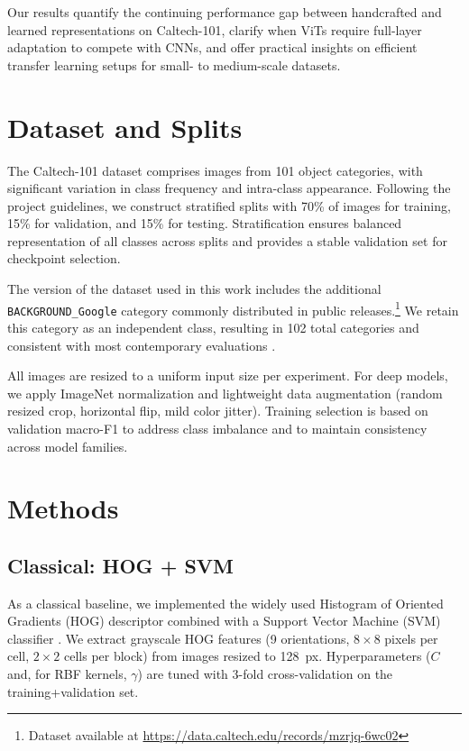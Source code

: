 \documentclass[11pt]{article}
\begin{document}
Our results quantify the continuing performance gap between handcrafted and learned representations on Caltech-101, clarify when ViTs require full-layer adaptation to compete with CNNs, and offer practical insights on efficient transfer learning setups for small- to medium-scale datasets.

\section{Dataset and Splits}
The Caltech-101 dataset \cite{FeiFei2004} comprises images from 101 object categories, with significant variation in class frequency and intra-class appearance. Following the project guidelines, we construct stratified splits with 70\% of images for training, 15\% for validation, and 15\% for testing. Stratification ensures balanced representation of all classes across splits and provides a stable validation set for checkpoint selection.

The version of the dataset used in this work includes the additional \texttt{BACKGROUND\_Google} category commonly distributed in public releases.\footnote{Dataset available at \url{https://data.caltech.edu/records/mzrjq-6wc02}} We retain this category as an independent class, resulting in 102 total categories and consistent with most contemporary evaluations \cite{Dalal2005,FeiFei2004}. 

All images are resized to a uniform input size per experiment. For deep models, we apply ImageNet normalization and lightweight data augmentation (random resized crop, horizontal flip, mild color jitter). Training selection is based on validation macro-F1 to address class imbalance and to maintain consistency across model families.
\section{Methods}
\subsection{Classical: HOG + SVM}
As a classical baseline, we implemented the widely used Histogram of Oriented Gradients (HOG) descriptor \cite{Dalal2005} combined with a Support Vector Machine (SVM) classifier \cite{Cortes1995}. 
We extract grayscale HOG features (9 orientations, $8 \times 8$ pixels per cell, $2 \times 2$ cells per block) from images resized to \SI{128}{px}. 
Hyperparameters ($C$ and, for RBF kernels, $\gamma$) are tuned with 3-fold cross-validation on the training+validation set. 
\end{document}
